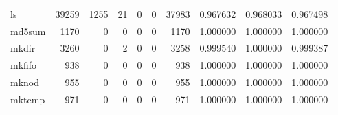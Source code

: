 \begin{tabular}{lrrrrrrrrr}
ls        &                               39259 &                                            1255 &                                             21 &                                             0 &                                              0 &                                        37983 &                                           0.967632 &                               0.968033 &                             0.967498 \\
md5sum    &                                1170 &                                               0 &                                              0 &                                             0 &                                              0 &                                         1170 &                                           1.000000 &                               1.000000 &                             1.000000 \\
mkdir     &                                3260 &                                               0 &                                              2 &                                             0 &                                              0 &                                         3258 &                                           0.999540 &                               1.000000 &                             0.999387 \\
mkfifo    &                                 938 &                                               0 &                                              0 &                                             0 &                                              0 &                                          938 &                                           1.000000 &                               1.000000 &                             1.000000 \\
mknod     &                                 955 &                                               0 &                                              0 &                                             0 &                                              0 &                                          955 &                                           1.000000 &                               1.000000 &                             1.000000 \\
mktemp    &                                 971 &                                               0 &                                              0 &                                             0 &                                              0 &                                          971 &                                           1.000000 &                               1.000000 &                             1.000000 \\

\end{tabular}
